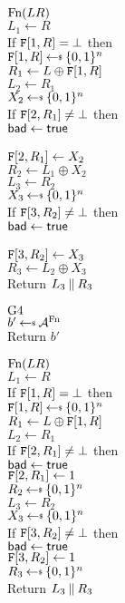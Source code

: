 \begin{figure}
{\underline{$\textnormal{Fn}(LR)$}\\
$L_1 \gets R$\\
If $\mathtt{F}[1,R] = \bot$ then\\
\ind $\TabF[1,R] \getsr \bits^n$\\
$R_1 \gets L \oplus \mathtt{F}[1,R]$\\
$L_2 \gets R_1$\\
$X_2 \getsr \bits^n$\\
If $\mathtt{F}[2,R_1] \ne \bot$ then\\
\ind $\mathsf{bad}\gets\mathsf{true}$\\
\ind {}\\
$\mathtt{F}[2,R_1] \gets X_2$\\
$R_2 \gets L_1 \oplus X_2$\\
$L_3 \gets R_2$\\
$X_3 \getsr \bits^n$\\
If $\mathtt{F}[3,R_2] \ne \bot$ then\\
\ind $\mathsf{bad}\gets\mathsf{true}$\\
\ind {}\\
$\mathtt{F}[3,R_2] \gets X_3$\\
$R_3 \gets L_2 \oplus X_3$\\
Return $L_3 \: \| \: R_3$
}{
\underline{${{\textnormal G}}4$}\\[2pt]
$b' \getsr \advA^\Fn$\\
Return $b'$\medskip

\underline{$\textnormal{Fn}(LR)$}\\
$L_1 \gets R$\\
If $\mathtt{F}[1,R] = \bot$ then\\
\ind $\TabF[1,R] \getsr \bits^n$\\
$R_1 \gets L \oplus \mathtt{F}[1,R]$\\
$L_2 \gets R_1$\\
If $\mathtt{F}[2,R_1] \ne \bot$ then\\
\ind $\mathsf{bad}\gets\mathsf{true}$\\
$\mathtt{F}[2,R_1] \gets 1$\\
$R_2 \getsr \bits^n$\\
$L_3 \gets R_2$\\
$X_3 \getsr \bits^n$\\
If $\mathtt{F}[3,R_2] \ne \bot$ then\\
\ind $\mathsf{bad}\gets\mathsf{true}$\\
$\mathtt{F}[3,R_2] \gets 1$\\
$R_3 \getsr \bits^n$\\
Return $L_3 \: \| \: R_3$
}
\end{figure}


